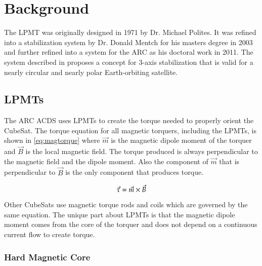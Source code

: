 

\chapter{Background}

\label{ch:BG}


The \ac{LPMT} was originally designed in 1971 by Dr. Michael Polites\cite{Polites71}. It was refined into a stabilization system by Dr. Donald Mentch for his masters degree in 2003 and further refined into a system for the \ac{ARC} as his doctoral work in 2011\cite{Mentch11}. The system described in \cite{Mentch11} proposes a concept for 3-axis stabilization that is valid for a nearly circular and nearly polar Earth-orbiting satellite.

\section{\aclp{LPMT}}

The \ac{ARC} \ac{ACDS} uses \acfp{LPMT} to create the torque needed to properly orient the CubeSat. The torque equation for all magnetic torquers, including the \acp{LPMT}, is shown in \cref{eq:magtorque} where $\vec{m}$ is the magnetic dipole moment of the torquer and $\vec{B}$ is the local magnetic field. The torque produced is always perpendicular to the magnetic field and the dipole moment. Also the component of $\vec{m}$ that is perpendicular to $\vec{B}$ is the only component that produces torque.

\begin{equation}
    \vec{\tau} = \vec{m} \times \vec{B}
    \label{eq:magtorque}
\end{equation}

Other CubeSats use magnetic torque rods and coils which are governed by the same equation. The unique part about \acp{LPMT} is that the magnetic dipole moment comes from the core of the torquer and does not depend on a continuous current flow to create torque.


\subsection{Hard Magnetic Core}

